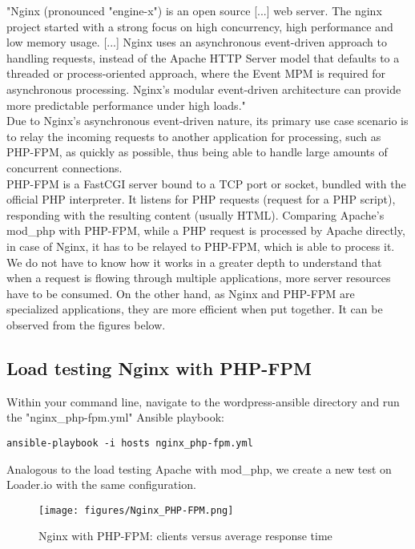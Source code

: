 "Nginx (pronounced "engine-x") is an open source [...] web server. The nginx project started with a strong focus on high concurrency, high performance and low memory usage. [...] Nginx uses an asynchronous event-driven approach to handling requests, instead of the Apache HTTP Server model that defaults to a threaded or process-oriented approach, where the Event MPM is required for asynchronous processing. Nginx's modular event-driven architecture can provide more predictable performance under high loads." \cite{Nginx:Wiki} \\

Due to Nginx's asynchronous event-driven nature, its primary use case scenario is to relay the incoming requests to another application for processing, such as PHP-FPM, as quickly as possible, thus being able to handle large amounts of concurrent connections. \\

PHP-FPM is a FastCGI server bound to a TCP port or socket, bundled with the official PHP interpreter. It listens for PHP requests (request for a PHP script), responding with the resulting content (usually HTML). Comparing Apache's mod\_php with PHP-FPM, while a PHP request is processed by Apache directly, in case of Nginx, it has to be relayed to PHP-FPM, which is able to process it. We do not have to know how it works in a greater depth to understand that when a request is flowing through multiple applications, more server resources have to be consumed. On the other hand, as Nginx and PHP-FPM are specialized applications, they are more efficient when put together. It can be observed from the figures below.

\subsection{Load testing Nginx with PHP-FPM}

Within your command line, navigate to the wordpress-ansible directory and run the "nginx\_php-fpm.yml" Ansible playbook:

\begin{lstlisting}
ansible-playbook -i hosts nginx_php-fpm.yml
\end{lstlisting}

Analogous to the load testing Apache with mod\_php, we create a new test on Loader.io with the same configuration. \cite{Loader.io:nginx_php-fpm}

\begin{figure}[H]
\begin{center}
\texttt{[image: figures/Nginx\_PHP-FPM.png]}
\caption{Nginx with PHP-FPM: clients versus average response time}
\label{fig:nginx_php-fpm}
\end{center}
\end{figure}


